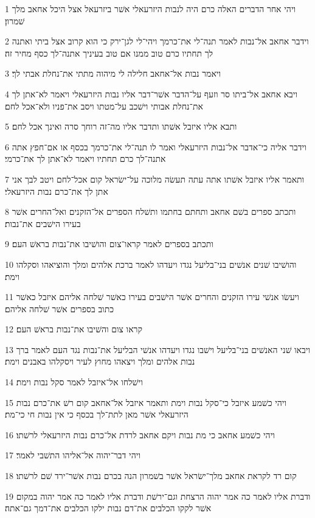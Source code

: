 \par 1 ויהי אחר הדברים האלה כרם היה לנבות היזרעאלי אשׁר ביזרעאל אצל היכל אחאב מלך שׁמרון׃
\par 2 וידבר אחאב אל־נבות לאמר תנה־לי את־כרמך ויהי־לי לגן־ירק כי הוא קרוב אצל ביתי ואתנה לך תחתיו כרם טוב ממנו אם טוב בעיניך אתנה־לך כסף מחיר זה׃
\par 3 ויאמר נבות אל־אחאב חלילה לי מיהוה מתתי את־נחלת אבתי לך׃
\par 4 ויבא אחאב אל־ביתו סר וזעף על־הדבר אשׁר־דבר אליו נבות היזרעאלי ויאמר לא־אתן לך את־נחלת אבותי וישׁכב על־מטתו ויסב את־פניו ולא־אכל לחם׃
\par 5 ותבא אליו איזבל אשׁתו ותדבר אליו מה־זה רוחך סרה ואינך אכל לחם׃
\par 6 וידבר אליה כי־אדבר אל־נבות היזרעאלי ואמר לו תנה־לי את־כרמך בכסף או אם־חפץ אתה אתנה־לך כרם תחתיו ויאמר לא־אתן לך את־כרמי׃
\par 7 ותאמר אליו איזבל אשׁתו אתה עתה תעשׂה מלוכה על־ישׂראל קום אכל־לחם ויטב לבך אני אתן לך את־כרם נבות היזרעאלי׃
\par 8 ותכתב ספרים בשׁם אחאב ותחתם בחתמו ותשׁלח הספרים אל־הזקנים ואל־החרים אשׁר בעירו הישׁבים את־נבות׃
\par 9 ותכתב בספרים לאמר קראו־צום והושׁיבו את־נבות בראשׁ העם׃
\par 10 והושׁיבו שׁנים אנשׁים בני־בליעל נגדו ויעדהו לאמר ברכת אלהים ומלך והוציאהו וסקלהו וימת׃
\par 11 ויעשׂו אנשׁי עירו הזקנים והחרים אשׁר הישׁבים בעירו כאשׁר שׁלחה אליהם איזבל כאשׁר כתוב בספרים אשׁר שׁלחה אליהם׃
\par 12 קראו צום והשׁיבו את־נבות בראשׁ העם׃
\par 13 ויבאו שׁני האנשׁים בני־בליעל וישׁבו נגדו ויעדהו אנשׁי הבליעל את־נבות נגד העם לאמר ברך נבות אלהים ומלך ויצאהו מחוץ לעיר ויסקלהו באבנים וימת׃
\par 14 וישׁלחו אל־איזבל לאמר סקל נבות וימת׃
\par 15 ויהי כשׁמע איזבל כי־סקל נבות וימת ותאמר איזבל אל־אחאב קום רשׁ את־כרם נבות היזרעאלי אשׁר מאן לתת־לך בכסף כי אין נבות חי כי־מת׃
\par 16 ויהי כשׁמע אחאב כי מת נבות ויקם אחאב לרדת אל־כרם נבות היזרעאלי לרשׁתו׃
\par 17 ויהי דבר־יהוה אל־אליהו התשׁבי לאמר׃
\par 18 קום רד לקראת אחאב מלך־ישׂראל אשׁר בשׁמרון הנה בכרם נבות אשׁר־ירד שׁם לרשׁתו׃
\par 19 ודברת אליו לאמר כה אמר יהוה הרצחת וגם־ירשׁת ודברת אליו לאמר כה אמר יהוה במקום אשׁר לקקו הכלבים את־דם נבות ילקו הכלבים את־דמך גם־אתה׃
